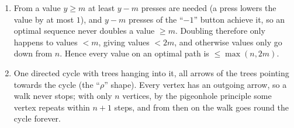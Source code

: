 \begin{solutionbox}
\begin{enumerate}[leftmargin=*]
    \item From a value $y \ge m$ at least $y - m$ presses are needed (a press lowers the value by at most $1$), and $y - m$ presses of the ``$-1$'' button achieve it, so an optimal sequence never doubles a value $\ge m$. Doubling therefore only happens to values $< m$, giving values $< 2m$, and otherwise values only go down from $n$. Hence every value on an optimal path is $\le \max(n, 2m)$.
    \item One directed cycle with trees hanging into it, all arrows of the trees pointing towards the cycle (the ``$\rho$'' shape). Every vertex has an outgoing arrow, so a walk never stops; with only $n$ vertices, by the pigeonhole principle some vertex repeats within $n+1$ steps, and from then on the walk goes round the cycle forever.
\end{enumerate}
\end{solutionbox}
\endgroup
